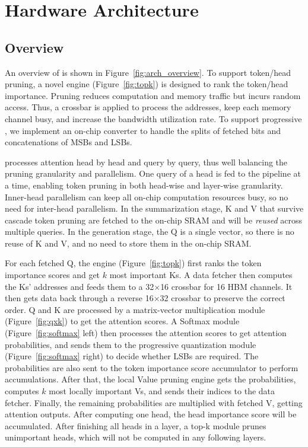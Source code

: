 \section{Hardware Architecture}
\label{sec:arch}
\subsection{Overview}
An overview of \spatten is shown in Figure~\ref{fig:arch_overview}. 
To support token/head pruning, a novel \topk engine (Figure~\ref{fig:topk}) is designed to rank the token/head importance. Pruning reduces computation and memory traffic but incurs random access. Thus, a crossbar is applied to process the addresses, keep each memory channel busy, and increase the bandwidth utilization rate. To support progressive \lowprec, we implement an on-chip \bitwidth converter to handle the splits of fetched bits and concatenations of MSBs and LSBs.


\spatten processes attention head by head and query by query, thus well balancing the pruning granularity and parallelism. One query of a head is fed to the pipeline at a time, enabling token pruning in both head-wise and layer-wise granularity. Inner-head parallelism can keep all on-chip computation resources busy, so no need for inter-head parallelism. In the summarization stage, K and V that survive cascade token pruning are fetched to the on-chip SRAM and will be \emph{reused} across multiple queries. In the generation stage, the Q is a single vector, so there is no reuse of K and V, and no need to store them in the on-chip SRAM.


For each fetched Q, the \topk engine (Figure~\ref{fig:topk}) first ranks the token importance scores and get $k$ most important Ks. A data fetcher then computes the Ks' addresses and feeds them to a 32$\times$16 crossbar for 16 HBM channels. It then gets data back through a reverse 16$\times$32 crossbar to preserve the correct order. 
Q and K are processed by a matrix-vector multiplication module (Figure~\ref{fig:qxk}) to get the attention scores. 
A Softmax module (Figure~\ref{fig:softmax} left) then processes the attention scores to get attention probabilities, and sends them to the progressive quantization module (Figure~\ref{fig:softmax} right) to decide whether LSBs are required. The probabilities are also sent to the token importance score accumulator to perform accumulations.
After that, the local Value pruning \topk engine gets the probabilities, computes $k$ most locally important Vs, and sends their indices to the data fetcher. Finally, the remaining probabilities are multiplied with fetched V, getting attention outputs. After computing one head, the head importance score will be accumulated. After finishing all heads in a layer, a top-k module prunes unimportant heads, which will not be computed in any following layers. 


